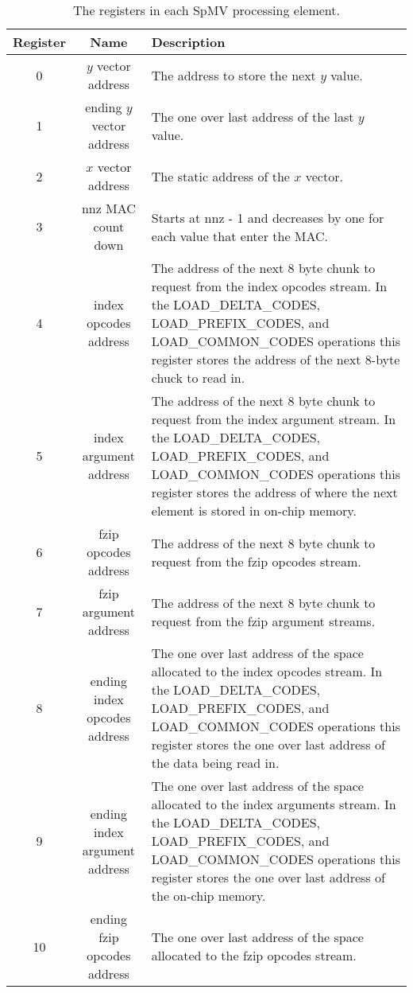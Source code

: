 \begin{table}
    \centering
    \caption{The registers in each SpMV processing element.}
    \label{tbl:registers}
    \begin{tabular}{|c|c|m{8cm}|}
        \hline
        Register & Name & Description\\
        \hline
        0 & $y$ vector address & The address to store the next $y$ value. \\
        \hline
        1 & ending $y$ vector address & The one over last address of the last $y$ value.\\
        \hline
        2 & $x$ vector address & The static address of the $x$ vector.\\
        \hline
        3 & nnz MAC count down & Starts at nnz - 1 and decreases by one for each value that enter the MAC.\\
        \hline
        4 & index opcodes address & The address of the next 8 byte chunk to request from the index opcodes stream. In the LOAD\_DELTA\_CODES, LOAD\_PREFIX\_CODES, and LOAD\_COMMON\_CODES operations this register stores the address of the next 8-byte chuck to read in.\\
        \hline
        5 & index argument address & The address of the next 8 byte chunk to request from the index argument stream. In the LOAD\_DELTA\_CODES, LOAD\_PREFIX\_CODES, and LOAD\_COMMON\_CODES operations this register stores the address of where the next element is stored in on-chip memory.\\
        \hline
        6 & fzip opcodes address & The address of the next 8 byte chunk to request from the fzip opcodes stream.\\
        \hline
        7 & fzip argument address & The address of the next 8 byte chunk to request from the fzip argument streams.\\
        \hline
        8 & ending index opcodes address & The one over last address of the space allocated to the index opcodes stream. In the LOAD\_DELTA\_CODES, LOAD\_PREFIX\_CODES, and LOAD\_COMMON\_CODES operations this register stores the one over last address of the data being read in.\\
        \hline
        9 & ending index argument address & The one over last address of the space allocated to the index arguments stream. In the LOAD\_DELTA\_CODES, LOAD\_PREFIX\_CODES, and LOAD\_COMMON\_CODES operations this register stores the one over last address of the on-chip memory.\\
        \hline
        10 & ending fzip opcodes address & The one over last address of the space allocated to the fzip opcodes stream.\\

\end{tabular}
\end{table}
